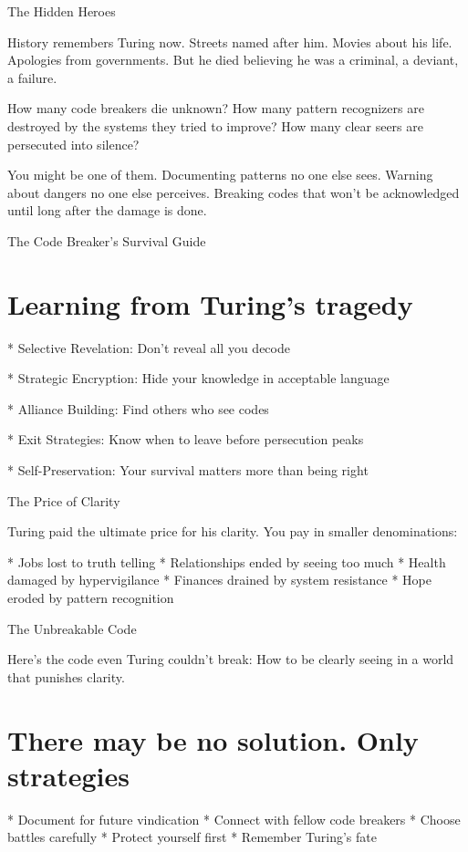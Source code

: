\documentclass[12pt,oneside]{book}
\begin{document}
The Hidden Heroes

History remembers Turing now. Streets named after him. Movies about his life. Apologies from governments. But he died believing he was a criminal, a deviant, a failure.

How many code breakers die unknown? How many pattern recognizers are destroyed by the systems they tried to improve? How many clear seers are persecuted into silence?

You might be one of them. Documenting patterns no one else sees. Warning about dangers no one else perceives. Breaking codes that won't be acknowledged until long after the damage is done.

The Code Breaker's Survival Guide

\section{Learning from Turing's tragedy}

                    * Selective Revelation: Don't reveal all you decode

                    * Strategic Encryption: Hide your knowledge in acceptable language

                    * Alliance Building: Find others who see codes

                    * Exit Strategies: Know when to leave before persecution peaks

                    * Self-Preservation: Your survival matters more than being right

The Price of Clarity

Turing paid the ultimate price for his clarity. You pay in smaller denominations:

                    * Jobs lost to truth telling
                    * Relationships ended by seeing too much
                    * Health damaged by hypervigilance
                    * Finances drained by system resistance
                    * Hope eroded by pattern recognition

The Unbreakable Code

Here's the code even Turing couldn't break: How to be clearly seeing in a world that punishes clarity.

\section{There may be no solution. Only strategies}

                    * Document for future vindication
                    * Connect with fellow code breakers
                    * Choose battles carefully
                    * Protect yourself first
                    * Remember Turing's fate
\end{document}
